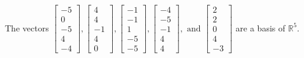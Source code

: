 \begin{exercise}
\begin{exerciseStatement}
  \end{exerciseStatement}
  \begin{exerciseAnswer}
   The vectors \(\left[\begin{array}{r}
-5 \\
0 \\
-5 \\
4 \\
-4
\end{array}\right] , \left[\begin{array}{r}
4 \\
4 \\
-1 \\
4 \\
0
\end{array}\right] , \left[\begin{array}{r}
-1 \\
-1 \\
1 \\
-5 \\
-5
\end{array}\right] , \left[\begin{array}{r}
-4 \\
-5 \\
-1 \\
4 \\
4
\end{array}\right] , \text{ and } \left[\begin{array}{r}
2 \\
2 \\
0 \\
4 \\
-3
\end{array}\right]\) 
  	 are  a basis of \(\mathbb{R}^5\).
  


  \end{exerciseAnswer}
\end{exercise}